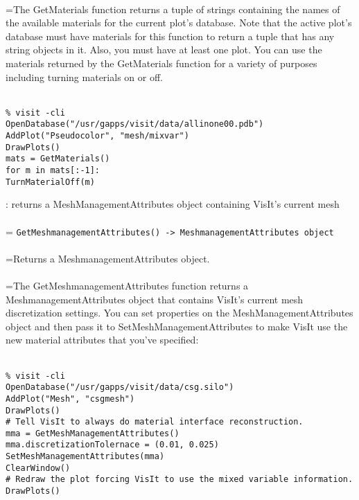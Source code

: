 \documentclass[10pt,a4paper]{report}
\begin{document}
 \\ 
\hangindent=\parindent The GetMaterials function returns a tuple of strings containing the names of the available materials for the current plot's database. Note that the active plot's database must have materials for this function to return a tuple that has any string objects in it. Also, you must have at least one plot. You can use the materials returned by the GetMaterials function for a variety of purposes including turning materials on or off. \\[-3mm] 

\\[-6mm]
\begin{verbatim}% visit -cli
OpenDatabase("/usr/gapps/visit/data/allinone00.pdb")
AddPlot("Pseudocolor", "mesh/mixvar")
DrawPlots()
mats = GetMaterials()
for m in mats[:-1]:
TurnMaterialOff(m)
\end{verbatim}
\newpage


{}
: returns a MeshManagementAttributes object containing VisIt's current mesh\\[-3mm]

 \\ 
\hangindent=\parindent 
\verb!GetMeshmanagementAttributes() -> MeshmanagementAttributes object!\\ [-3mm]

 \\ 
\hangindent=\parindent Returns a MeshmanagementAttributes object. \\[-3mm] 

 \\ 
\hangindent=\parindent The GetMeshmanagementAttributes function returns a MeshmanagementAttributes object that contains VisIt's current mesh discretization settings. You can set properties on the MeshManagementAttributes object and then pass it to SetMeshManagementAttributes to make VisIt use the new material attributes that you've specified: \\[-3mm] 

\\[-6mm]
\begin{verbatim}% visit -cli
OpenDatabase("/usr/gapps/visit/data/csg.silo")
AddPlot("Mesh", "csgmesh")
DrawPlots()
# Tell VisIt to always do material interface reconstruction.
mma = GetMeshManagementAttributes()
mma.discretizationTolernace = (0.01, 0.025)
SetMeshManagementAttributes(mma)
ClearWindow()
# Redraw the plot forcing VisIt to use the mixed variable information.
DrawPlots()
\end{verbatim}
\newpage
\end{document}
